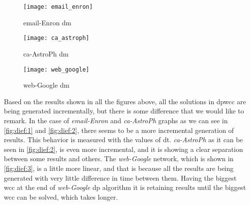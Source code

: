 \begin{figure}[!htb]
    \centering
    \begin{minipage}{0.33\textwidth}
     \texttt{[image: email\_enron]}
      \caption[\acrshort{dm} Results: email-Enron]{email-Enron \acrshort{dm}}
      \label{fig:dief:1}
    \end{minipage}%
    \begin{minipage}{0.33\textwidth}
     \texttt{[image: ca\_astroph]}
      \caption[\acrshort{dm} Results: ca-AstroPh]{ca-AstroPh \acrshort{dm}}
      \label{fig:dief:2}
    \end{minipage}%
    \begin{minipage}{0.33\textwidth}
     \texttt{[image: web\_google]}
      \caption[\acrshort{dm} Results: web-Google]{web-Google \acrshort{dm}}
      \label{fig:dief:3}
    \end{minipage}
\end{figure}

Based on the results shown in all the figures above, all the solutions in \acrshort{dpwcc} are being generated incrementally, 
but there is some difference that we would like to remark. In the case of \emph{email-Enron} and \emph{ca-AstroPh} graphs 
as we can see in \autoref{fig:dief:1} and \autoref{fig:dief:2}, there seems to be a more incremental generation of results. 
This behavior is measured with the values of \acrfull{dt}. \emph{ca-AstroPh} as it can be seen in \autoref{fig:dief:2}, is even more incremental, and it is showing a clear separation between some results and others. 
The \emph{web-Google} network, which is shown in \autoref{fig:dief:3}, is a little more linear, and that is because all the results are being generated with very little difference in time between them. 
Having the biggest \acrshort{wcc} at the end of \emph{web-Google} \acrshort{dp} algorithm 
it is retaining results until the biggest \acrshort{wcc} can be solved, which takes longer. 


